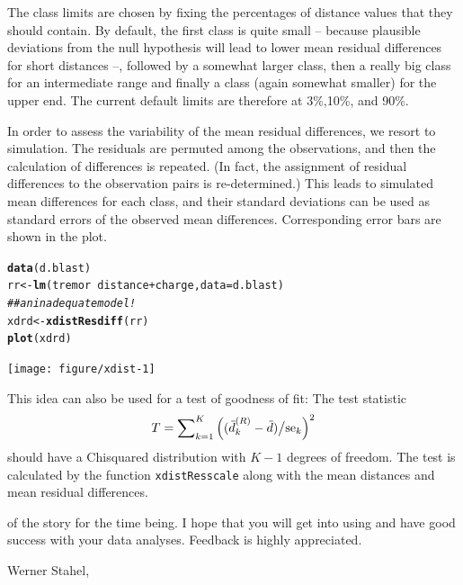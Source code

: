 \documentclass[11pt]{article}\usepackage[]{graphicx}\usepackage[]{color}
\makeatletter
\newcommand{\hlcom}[1]{\textcolor[rgb]{0.678,0.584,0.686}{\textit{#1}}}%
\newcommand{\hlopt}[1]{\textcolor[rgb]{0,0,0}{#1}}%
\newcommand{\hlstd}[1]{\textcolor[rgb]{0.345,0.345,0.345}{#1}}%
\newcommand{\hlkwb}[1]{\textcolor[rgb]{0.69,0.353,0.396}{#1}}%
\newcommand{\hlkwc}[1]{\textcolor[rgb]{0.333,0.667,0.333}{#1}}%
\newcommand{\hlkwd}[1]{\textcolor[rgb]{0.737,0.353,0.396}{\textbf{#1}}}%
\newenvironment{kframe}{%
 \def\at@end@of@kframe{}%
 \ifinner\ifhmode%
  \def\at@end@of@kframe{\end{minipage}}%
  \begin{minipage}{\columnwidth}%
 \fi\fi%
 \def\FrameCommand##1{\hskip\@totalleftmargin \hskip-\fboxsep
 \colorbox{shadecolor}{##1}\hskip-\fboxsep
     \hskip-\linewidth \hskip-\@totalleftmargin \hskip\columnwidth}%
 \MakeFramed {\advance\hsize-\width
   \@totalleftmargin\z@ \linewidth\hsize
   \@setminipage}}%
 {\par\unskip\endMakeFramed%
 \at@end@of@kframe}
\newenvironment{knitrout}{}{} %
\makeatother
\begin{document}
The class limits are chosen by fixing the percentages of distance values
that they should contain. By default, the first class is quite small -- 
because plausible deviations from the null hypothesis will lead to lower
mean residual differences for short distances --, followed by a somewhat
larger class, then a really big class for an intermediate range and finally
a class (again somewhat smaller) for the upper end. 
The current default limits are therefore at 3\%,10\%, and 90\%. 

In order to assess the variability of the mean residual differences,
we resort to simulation. The residuals are permuted among the observations,
and then the calculation of differences is repeated.
(In fact, the assignment of residual differences to the observation pairs 
is re-determined.) This leads to simulated mean differences for each class,
and their standard deviations can be used as standard errors of the 
observed mean differences. Corresponding error bars are shown in the
plot. 

\begin{knitrout}
\color{fgcolor}\begin{kframe}
\begin{alltt}
\hlkwd{data}\hlstd{(d.blast)}
\hlstd{rr} \hlkwb{<-} \hlkwd{lm}\hlstd{(tremor}\hlopt{~}\hlstd{distance}\hlopt{+}\hlstd{charge,} \hlkwc{data}\hlstd{=d.blast)}
\hlcom{## an inadequate model!}
\hlstd{xdrd} \hlkwb{<-} \hlkwd{xdistResdiff}\hlstd{(rr)}
\hlkwd{plot}\hlstd{(xdrd)}
\end{alltt}
\end{kframe}
\texttt{[image: figure/xdist-1]} 

\end{knitrout}

This idea can also be used for a test of goodness of fit: The test
statistic 
$$
  T = \sum\nolimits_{k=1}^K \left((\wb d\sups R_k-\wb d)\big/\mbox{se}_k\right)^2
$$
should have a Chisquared distribution with $K-1$ degrees of freedom.
The test is calculated by the function \texttt{xdistResscale} along with
the mean distances and mean residual differences.

\vspace{10mm}\noindent
{\small
{} of the story for the time being. I hope that you will
get into using  and have good success with your data analyses.
Feedback is highly appreciated.


Werner Stahel, 
}
\end{document}
